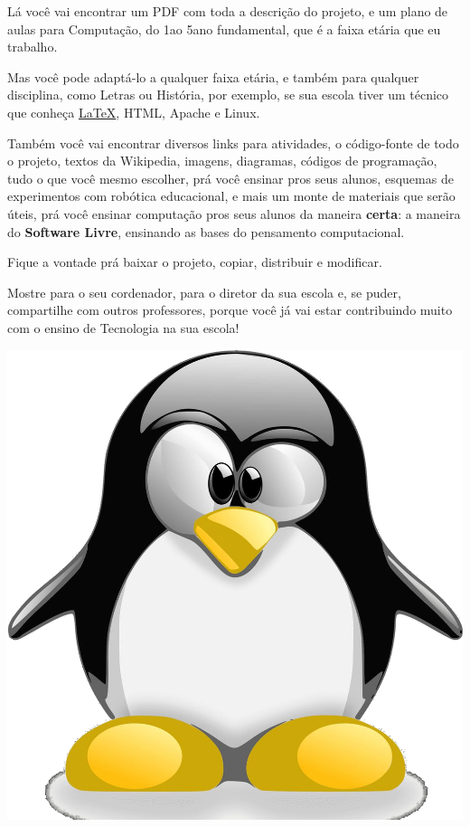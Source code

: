 \begin{multicols}{2}
Lá você vai encontrar um PDF com toda a descrição do projeto, e um plano de aulas para Computação, do 1\textordmasculine\space ao 5\textordmasculine\space ano fundamental, que é a faixa etária que eu trabalho.

Mas você pode adaptá-lo a qualquer faixa etária, e também para qualquer disciplina, como Letras ou História, por exemplo, se sua escola tiver um técnico que conheça \href{https://www.latex-project.org}{\LaTeX}, HTML, Apache e Linux.

Também você vai encontrar diversos links para atividades, o código-fonte de todo o projeto, textos da Wikipedia, imagens, diagramas, códigos de programação, tudo o que você mesmo escolher, prá você ensinar pros seus alunos, esquemas de experimentos com robótica educacional, e mais um monte de materiais que serão úteis, prá você ensinar computação pros seus alunos da maneira \textbf{certa}: a maneira do \textbf{Software Livre}, ensinando as bases do pensamento computacional.

Fique a vontade prá baixar o projeto, copiar, distribuir e modificar.

Mostre para o seu cordenador, para o diretor da sua escola e, se puder, compartilhe com outros professores, porque você já vai estar contribuindo muito com o ensino de Tecnologia na sua escola!

	\begin{center}
	
	\includegraphics[width=.4\linewidth]{./IMG-GIT/tux.png}

\end{center}
\vfill
\end{multicols}

\pagebreak